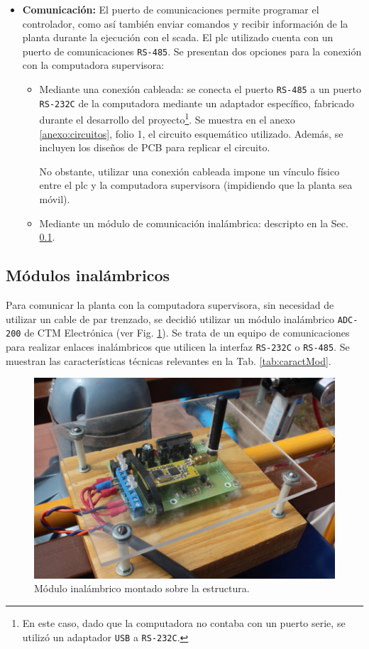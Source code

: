 \begin{itemize}
\item \textbf{Comunicación:} El puerto de comunicaciones permite programar el 
controlador, como así también enviar comandos y recibir información de
la planta durante la ejecución con el \gls{scada}.
El \gls{plc} utilizado cuenta con un puerto de comunicaciones \verb|RS-485|.
Se presentan dos opciones para la conexión con la computadora supervisora:
\begin{itemize}
 \item Mediante una conexión cableada:
 se conecta el puerto \verb|RS-485| a un puerto \verb|RS-232C| de la computadora
mediante un adaptador específico, fabricado durante el desarrollo del
proyecto\footnote{En este caso, dado que la computadora no contaba con un
puerto serie, se utilizó un adaptador
\texttt{USB} a \texttt{RS-232C}.}.
Se muestra en el anexo \ref{anexo:circuitos}, folio 1, el circuito esquemático
utilizado.
Además, se incluyen los diseños de PCB para replicar el circuito.

No obstante, utilizar una conexión cableada impone un vínculo físico entre
el \gls{plc} y la computadora supervisora (impidiendo que la planta sea móvil).
\item Mediante un módulo de comunicación inalámbrica:
descripto en la Sec. \ref{subsec:inalambrico}.
\end{itemize}
\end{itemize}

\subsection{Módulos inalámbricos}
\label{subsec:inalambrico}

Para comunicar la planta con la computadora supervisora, sin necesidad de
utilizar un cable de par trenzado, se decidió utilizar un módulo inalámbrico
\verb|ADC-200| de CTM Electrónica (ver Fig. \ref{fig:fotoModuloIn}).
Se trata de un equipo de comunicaciones para realizar enlaces inalámbricos que
utilicen la interfaz \verb|RS-232C| o \verb|RS-485|.
Se muestran las características técnicas relevantes en la Tab.
\ref{tab:caractMod}.

\begin{figure}[t]
\centering
\includegraphics[width=.6\textwidth]{Cap3-TableroElectrico/Images/IMG_5038.JPG}
 \caption{Módulo inalámbrico montado sobre la estructura.}
 \label{fig:fotoModuloIn}
\end{figure}

